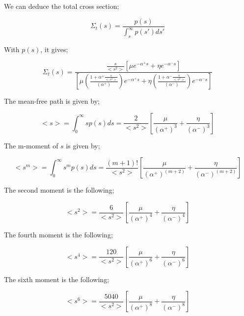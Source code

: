 \documentclass[a4paper, 12pt]{report}
\newcommand{\bl}{\big<}
\newcommand{\bg}{\big>}
\begin{document}
We can deduce the total cross section;

\begin{equation}
\Sigma_t(s) = \frac{p(s)}{\int_s^\infty p(s')ds'}
\end{equation}

With $p(s)$, it gives;

\begin{equation}
\Sigma_t(s) = \frac{\frac{s}{{{\bl s^2 \bg}}} \left[\mu e^{-\alpha^+ s} + \eta e^{-\alpha^- s}\right]}{\left[\mu \left( \frac{1+ \alpha^+\frac{s}{{{\bl s^2 \bg}}}}{\left(\alpha^+\right)}\right)e^{-\alpha^+ s} + \eta \left( \frac{1+ \alpha^-\frac{s}{{{\bl s^2 \bg}}}}{\left(\alpha^-\right)}\right)e^{-\alpha^- s}\right]}
\end{equation}

The mean-free path is given by;

\begin{equation}
{\bl s\bg} = \int_0^\infty sp(s) ds = \frac{2}{{\bl s^2 \bg}}\left[\frac{\mu}{\left(\alpha^+\right)^3} + \frac{\eta}{\left(\alpha^-\right)^3}\right]
\end{equation}

The m-moment of $s$ is given by;

\begin{equation}
{\bl s^m \bg} = \int_0^\infty s^m p(s) ds = \frac{(m+1)!}{{\bl s^2 \bg}}\left[\frac{\mu}{\left(\alpha^+\right)^{(m+2)}} + \frac{\eta}{\left(\alpha^-\right)^{(m+2)}}\right]
\end{equation}

The second moment is the following;

\begin{equation}
{\bl s^2 \bg} = \frac{6}{{\bl s^2 \bg}}\left[\frac{\mu}{\left(\alpha^+\right)^{4}} + \frac{\eta}{\left(\alpha^-\right)^{4}}\right]
\end{equation}

The fourth moment is the following;

\begin{equation}
{\bl s^4 \bg} = \frac{120}{{\bl s^2 \bg}}\left[\frac{\mu}{\left(\alpha^+\right)^{6}} + \frac{\eta}{\left(\alpha^-\right)^{6}}\right]
\end{equation}

The sixth moment is the following;

\begin{equation}
{\bl s^6 \bg} = \frac{5040}{{\bl s^2 \bg}}\left[\frac{\mu}{\left(\alpha^+\right)^{8}} + \frac{\eta}{\left(\alpha^-\right)^{8}}\right]
\end{equation}
\end{document}
